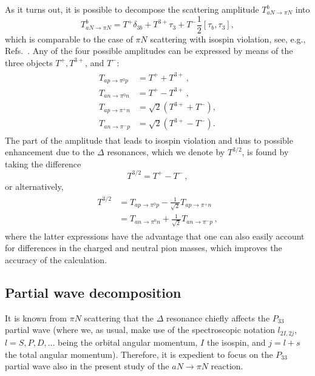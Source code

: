 \documentclass[reprint,amssymb,amsmath,floatfix,aps,prd,groupedaddress,nofootinbib]{revtex4-2}
\newcommand{\com}[2]{\left[ #1,#2 \right]}
\begin{document}
As it turns out, it is possible to decompose the scattering amplitude $T^{b}_{aN\to\pi N}$ into
\begin{equation}\label{eq:isoprojection}
T^{b}_{aN\to\pi N} =  T^+ \delta_{3b} +  T^{3+} \tau_3 + T^{-} \frac{1}{2}\com{\tau_b}{\tau_3}  ,
\end{equation}
which is comparable to the case of $\pi N$ scattering with isospin violation, see, e.g.,
Refs.~\cite{Fettes:2000vm,Hoferichter:2009gn}. Any of the four possible amplitudes can be expressed by means
of the three objects $ T^+, T^{3+}$, and $T^{-}$:
\begin{align}
\begin{split}
T_{ap\to\pi^0 p} & = T^+ + T^{3+}\,, \\ 
T_{an\to\pi^0 n} & = T^+ - T^{3+}\,, \\
T_{ap\to\pi^+ n} & = \sqrt{2}\left(T^{3+} + T^{-}\right),\\
T_{an\to\pi^- p} & = \sqrt{2}\left(T^{3+} - T^{-}\right).
\end{split}
\end{align}
The part of the amplitude that leads to isospin violation and thus to possible enhancement due to the $\Delta$
resonances, which we denote by $T^{3/2}$, is found by taking the difference
\begin{equation}\label{eq:Tdifference}
T^{3/2} = T^+ - T^{-}\,,
\end{equation}
or alternatively,
\begin{align}\label{eq:Tdifference2}
\begin{split}
T^{3/2}	& =  T_{ap\to\pi^0 p} - \frac{1}{\sqrt{2}} T_{ap\to\pi^+ n} \\
  	& =  T_{an\to\pi^0 n} + \frac{1}{\sqrt{2}} T_{an\to\pi^- p}\,,
\end{split}
\end{align}
where the latter expressions have the advantage that one can also easily account
for differences in the charged and neutral pion masses, which improves the accuracy of the calculation.

\subsection{Partial wave decomposition}

It is known from  $\pi N$ scattering that the $\Delta$ resonance chiefly affects the $P_{33}$ partial wave
(where we, as usual, make use of the spectroscopic notation $l_{2I,2j}$, $l = S, P, D, \dots$ being the
orbital angular momentum, $I$ the isospin, and $j=l+s$ the total angular momentum). Therefore, it
is expedient to focus on the $P_{33}$ partial wave also in the present study of the $aN\to\pi N$ reaction.
\end{document}
